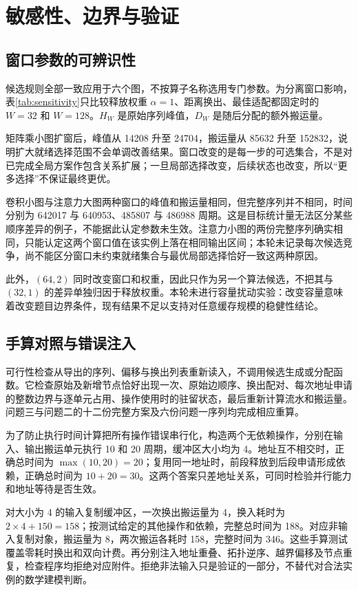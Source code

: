 \section{敏感性、边界与验证}
\subsection{窗口参数的可辨识性}
候选规则全部一致应用于六个图，不按算子名称选用专门参数。为分离窗口影响，表\ref{tab:sensitivity}只比较释放权重 $\alpha=1$、距离换出、最佳适配都固定时的 $W=32$ 和 $W=128$。$H_W$ 是原始序列峰值，$D_W$ 是随后分配的额外搬运量。
\begin{table}[H]\centering\caption{固定其他规则时的窗口对照}\label{tab:sensitivity}\small
\end{table}
矩阵乘小图扩窗后，峰值从 14208 升至 24704，搬运量从 85632 升至 152832，说明扩大就绪选择范围不会单调改善结果。窗口改变的是每一步的可选集合，不是对已完成全局方案作包含关系扩展；一旦局部选择改变，后续状态也改变，所以“更多选择”不保证最终更优。

卷积小图与注意力大图两种窗口的峰值和搬运量相同，但完整序列并不相同，时间分别为 642017 与 640953、485807 与 486988 周期。这是目标统计量无法区分某些顺序差异的例子，不能据此认定参数未生效。注意力小图的两份完整序列确实相同，只能认定这两个窗口值在该实例上落在相同输出区间；本轮未记录每次候选竞争，尚不能区分窗口未约束就绪集合与最优局部选择恰好一致这两种原因。

此外，$(64,2)$ 同时改变窗口和权重，因此只作为另一个算法候选，不把其与 $(32,1)$ 的差异单独归因于释放权重。本轮未进行容量扰动实验：改变容量意味着改变题目边界条件，现有结果不足以支持对任意缓存规模的稳健性结论。

\subsection{手算对照与错误注入}
可行性检查从导出的序列、偏移与换出列表重新读入，不调用候选生成或分配函数。它检查原始及新增节点恰好出现一次、原始边顺序、换出配对、每次地址申请的整数边界与逐单元占用、操作使用时的驻留状态，最后重新计算流水和搬运量。问题三与问题二的十二份完整方案及六份问题一序列均完成相应重算。

为了防止执行时间计算把所有操作错误串行化，构造两个无依赖操作，分别在输入、输出搬运单元执行 10 和 20 周期，缓冲区大小均为 4。地址互不相交时，正确总时间为 $\max(10,20)=20$；复用同一地址时，前段释放到后段申请形成依赖，正确总时间为 $10+20=30$。这两个答案只差地址关系，可同时检验并行能力和地址等待是否生效。

对大小为 4 的输入复制缓冲区，一次换出搬运量为 4，换入耗时为 $2\times4+150=158$；按测试给定的其他操作和依赖，完整总时间为 188。对应非输入复制对象，搬运量为 8，两次搬运各耗时 158，完整时间为 346。这些手算测试覆盖零耗时换出和双向计费。再分别注入地址重叠、拓扑逆序、越界偏移及节点重复，检查程序均拒绝对应附件。拒绝非法输入只是验证的一部分，不替代对合法实例的数学建模判断。

